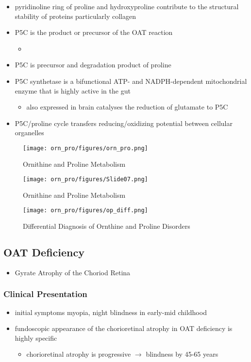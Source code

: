 \documentclass{scrartcl}
\begin{document}
\begin{itemize}
\item pyridinoline ring of proline and hydroxyproline contribute to the
structural stability of proteins particularly collagen
\item P5C is the product or precursor of the OAT reaction
\begin{itemize}
\item {}
\end{itemize}
\item P5C is precursor and degradation product of proline
\item P5C synthetase is a bifunctional ATP- and NADPH-dependent
mitochondrial enzyme that is highly active in the gut
\begin{itemize}
\item also expressed in brain catalyses the reduction of glutamate to
P5C
\end{itemize}
\item P5C/proline cycle transfers reducing/oxidizing potential between
cellular organelles
\end{itemize}


\begin{figure}[htbp]
\centering
\texttt{[image: orn\_pro/figures/orn\_pro.png]}
\caption{\label{fig:orgb7ac624}Ornithine and Proline Metabolism}
\end{figure}

\begin{figure}[htbp]
\centering
\texttt{[image: orn\_pro/figures/Slide07.png]}
\caption{\label{fig:orgfeb9381}Ornithine and Proline Metabolism}
\end{figure}

\begin{figure}[htbp]
\centering
\texttt{[image: orn\_pro/figures/op\_diff.png]}
\caption{\label{fig:org1e57aa2}Differential Diagnosis of Ornthine and Proline Disorders}
\end{figure}

\subsection{OAT Deficiency}
\label{sec:org24db5f8}
\begin{itemize}
\item Gyrate Atrophy of the Choriod Retina
\end{itemize}
\subsubsection{Clinical Presentation}
\label{sec:org2fcb609}
\begin{itemize}
\item initial symptoms myopia, night blindness in early-mid childhood
\item fundoscopic appearance of the chorioretinal atrophy in OAT deficiency is highly specific
\begin{itemize}
\item chorioretinal atrophy is progressive \(\to\) blindness by 45-65 years
\end{itemize}
\end{itemize}
\end{document}
